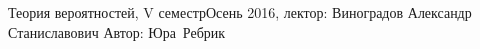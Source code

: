 


\BigHeader
    {Теория вероятностей, V семестр}{Осень 2016, лектор: Виноградов Александр Станиславович}
    {Автор: Юра~Ребрик}
\gdef\LectureName{Теор. вер-тей, IV семестр}


